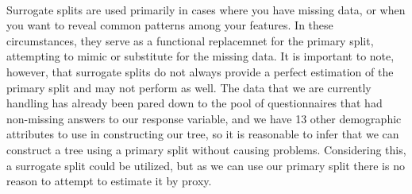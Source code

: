 \documentclass[11pt]{article}
\begin{document}
\begin{center}

\ \\
\end{center}


\vspace{5 mm}
\noindent
Surrogate splits are used primarily in cases where you have missing data, or when you want to reveal common patterns among your features.  In these circumstances, they serve as a functional replacemnet for the primary split, attempting to mimic or substitute for the missing data.  It is important to note, however, that surrogate splits do not always provide a perfect estimation of the primary split and may not perform as well.  The data that we are currently handling has already been pared down to the pool of questionnaires that had non-missing answers to our response variable, and we have 13 other demographic attributes to use in constructing our tree, so it is reasonable to infer that we can construct a tree using a primary split without causing problems.  Considering this, a surrogate split could be utilized, but as we can use our primary split there is no reason to attempt to estimate it by proxy. 
\end{document}
